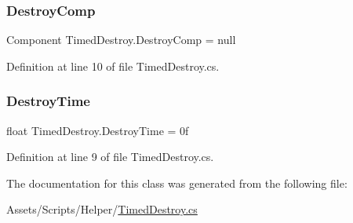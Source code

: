 \subsubsection{\texorpdfstring{Destroy\+Comp}{DestroyComp}}
{\footnotesize\ttfamily Component Timed\+Destroy.\+Destroy\+Comp = null}



Definition at line 10 of file Timed\+Destroy.\+cs.

\mbox{\label{class_timed_destroy_aed5f630a2c47308e0932ed672f9e1ce6}} 
\subsubsection{\texorpdfstring{Destroy\+Time}{DestroyTime}}
{\footnotesize\ttfamily float Timed\+Destroy.\+Destroy\+Time = 0f}



Definition at line 9 of file Timed\+Destroy.\+cs.



The documentation for this class was generated from the following file\+:\begin{DoxyCompactItemize}
\item 
Assets/\+Scripts/\+Helper/\mbox{\hyperlink{_timed_destroy_8cs}{Timed\+Destroy.\+cs}}\end{DoxyCompactItemize}
